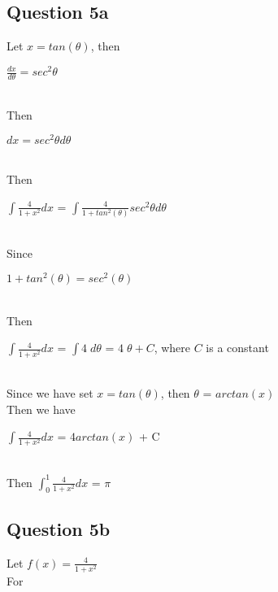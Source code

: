 \documentclass[11pt]{article} %
\begin{document}
\subsection{Question 5a}
Let $x = tan(\theta)$, then\\
\centerline{$\frac{dx}{d\theta} = sec^{2}\theta$}\\
Then\\
\centerline{$dx = sec^{2}\theta d\theta$}\\
Then\\
\centerline{$\int\frac{4}{1+x^2}dx$ = $\int\frac{4}{1+tan^2(\theta)}sec^{2}\theta d\theta$}\\
Since\\
\centerline{$1+tan^2(\theta) = sec^{2}(\theta)$}\\
Then\\
\centerline{$\int\frac{4}{1+x^2}dx$ = $\int 4\;d\theta$ = $4\;\theta + C$, where $C$ is a constant}\\
Since we have set $x = tan(\theta)$, then $\theta$ = $arctan(x)$\\
Then we have \\
\centerline{$\int\frac{4}{1+x^2}dx$ = $4arctan(x)$ + C}\\
Then $\int_{0}^{1}\frac{4}{1+x^2}dx$ = $\pi$
\subsection{Question 5b}
Let $f(x) = \frac{4}{1+x^{2}}$\\
For 
\end{document}
